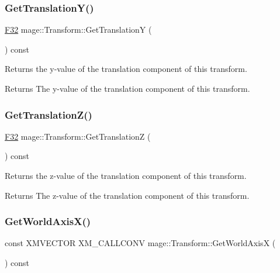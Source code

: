 \subsubsection{\texorpdfstring{Get\+Translation\+Y()}{GetTranslationY()}}
{\footnotesize\ttfamily \mbox{\hyperlink{namespacemage_aa97e833b45f06d60a0a9c4fc22ae02c0}{F32}} mage\+::\+Transform\+::\+Get\+TranslationY (\begin{DoxyParamCaption}{ }\end{DoxyParamCaption}) const\hspace{0.3cm}{\ttfamily [noexcept]}}

Returns the y-\/value of the translation component of this transform.

\begin{DoxyReturn}{Returns}
The y-\/value of the translation component of this transform. 
\end{DoxyReturn}
\mbox{\label{classmage_1_1_transform_a2899159e8e953026bf8b6863c65f454f}} 
\subsubsection{\texorpdfstring{Get\+Translation\+Z()}{GetTranslationZ()}}
{\footnotesize\ttfamily \mbox{\hyperlink{namespacemage_aa97e833b45f06d60a0a9c4fc22ae02c0}{F32}} mage\+::\+Transform\+::\+Get\+TranslationZ (\begin{DoxyParamCaption}{ }\end{DoxyParamCaption}) const\hspace{0.3cm}{\ttfamily [noexcept]}}

Returns the z-\/value of the translation component of this transform.

\begin{DoxyReturn}{Returns}
The z-\/value of the translation component of this transform. 
\end{DoxyReturn}
\mbox{\label{classmage_1_1_transform_aeb6b744fbe9843a7323fdde88421c3b4}} 
\subsubsection{\texorpdfstring{Get\+World\+Axis\+X()}{GetWorldAxisX()}}
{\footnotesize\ttfamily const X\+M\+V\+E\+C\+T\+OR X\+M\+\_\+\+C\+A\+L\+L\+C\+O\+NV mage\+::\+Transform\+::\+Get\+World\+AxisX (\begin{DoxyParamCaption}{ }\end{DoxyParamCaption}) const\hspace{0.3cm}{\ttfamily [noexcept]}}

